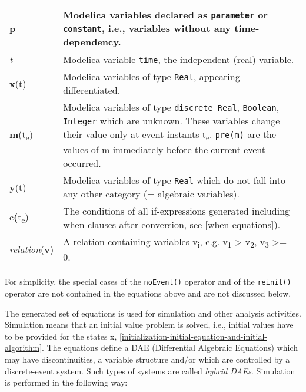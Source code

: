 \begin{longtable}[]{|p{2cm}|p{12cm}|}
\hline \endhead
\textbf{p} & Modelica variables declared as \lstinline!parameter! or
\lstinline!constant!, i.e., variables without any
time-dependency.\\ \hline
\emph{t} & Modelica variable \lstinline!time!, the independent (real)
variable.\\ \hline
\textbf{x}(t) & Modelica variables of type \lstinline!Real!, appearing
differentiated.\\ \hline
\textbf{m}(t\textsubscript{e}) & Modelica variables of type
\lstinline!discrete Real!, \lstinline!Boolean!, \lstinline!Integer! which are unknown. These
variables change their value only at event instants t\textsubscript{e}.
\lstinline!pre(m)! are the values of m immediately before the current event
occurred.\\ \hline
\textbf{y}(t) & Modelica variables of type \lstinline!Real! which do not fall
into any other category (= algebraic variables).\\ \hline
c\textbf{(}t\textsubscript{e}) & The conditions of all if-expressions
generated including when-clauses after conversion, see \autoref{when-equations}).\\ \hline
\emph{relation}(\textbf{v}) & A relation containing variables
v\textsubscript{i}, e.g. v\textsubscript{1} \textgreater{}
v\textsubscript{2}, v\textsubscript{3} \textgreater{}= 0.\\ \hline

\end{longtable}

For simplicity, the special cases of the \lstinline!noEvent()! operator and of the
\lstinline!reinit()! operator are not contained in the equations above and are not
discussed below.

The generated set of equations is used for simulation and other analysis
activities. Simulation means that an initial value problem is solved,
i.e., initial values have to be provided for the states x, \autoref{initialization-initial-equation-and-initial-algorithm}.
The equations define a DAE (Differential Algebraic Equations) which may
have discontinuities, a variable structure and/or which are controlled
by a discrete-event system. Such types of systems are called
\emph{hybrid DAEs}. Simulation is performed in the following way:

